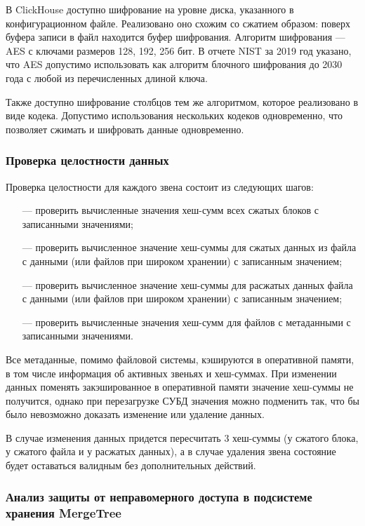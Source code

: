 В ClickHouse доступно шифрование на уровне диска, указанного в конфигурационном файле. Реализовано оно схожим со сжатием образом: поверх буфера записи в файл находится буфер шифрования. Алгоритм шифрования --- AES с ключами размеров 128, 192, 256 бит. В отчете NIST \cite{nist} за 2019 год указано, что AES допустимо использовать как алгоритм блочного шифрования до 2030 года с любой из перечисленных длиной ключа.

Также доступно шифрование столбцов тем же алгоритмом, которое реализовано в виде кодека. Допустимо использования нескольких кодеков одновременно, что позволяет сжимать и шифровать данные одновременно.

\subsubsection{Проверка целостности данных}

Проверка целостности для каждого звена состоит из следующих шагов:
\begin{itemize}
	\item [---] проверить вычисленные значения хеш-сумм всех сжатых блоков с записанными значениями;
	\item [---] проверить вычисленное значение хеш-суммы для сжатых данных из файла с данными (или файлов при широком хранении) с записанным значением;
	\item [---] проверить вычисленное значение хеш-суммы для расжатых данных файла с данными (или файлов при широком хранении) с записанным значением;
	\item [---] проверить вычисленные значения хеш-сумм для файлов с метаданными с записанными значениями.
\end{itemize}

Все метаданные, помимо файловой системы, кэшируются в оперативной памяти, в том числе информация об активных звеньях и хеш-суммах. При изменении данных поменять закэшированное в оперативной памяти значение хеш-суммы не получится, однако при перезагрузке СУБД значения можно подменить так, что бы было невозможно доказать изменение или удаление данных.

В случае изменения данных придется пересчитать 3 хеш-суммы (у сжатого блока, у сжатого файла и у расжатых данных), а в случае удаления звена состояние будет оставаться валидным без дополнительных действий.

\subsubsection{Анализ защиты от неправомерного доступа в подсистеме хранения MergeTree}

